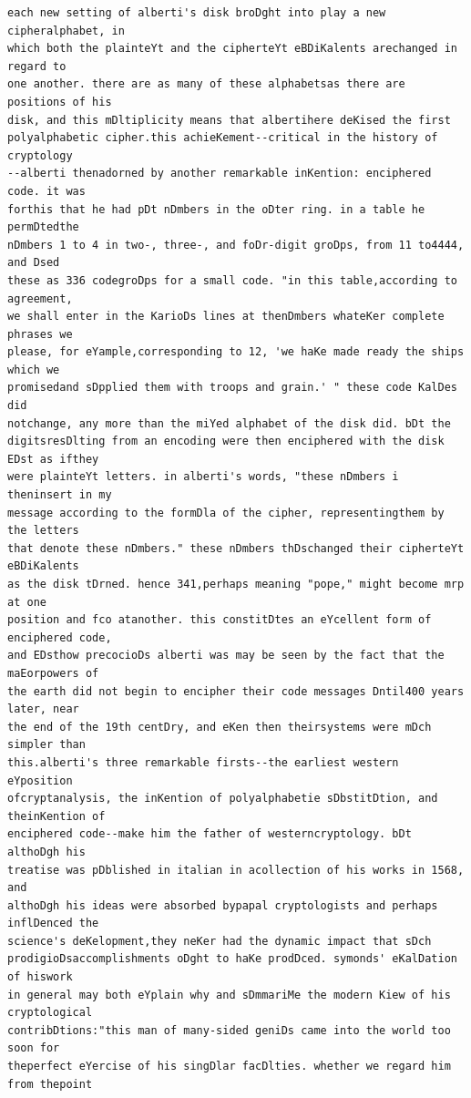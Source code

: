 \documentclass[12pt,a4paper]{article}
\begin{document}
\begin{lstlisting}[caption={Complete text after iteration 11}, label={lst:iter11}]
each new setting of alberti's disk broDght into play a new cipheralphabet, in
which both the plainteYt and the cipherteYt eBDiKalents arechanged in regard to
one another. there are as many of these alphabetsas there are positions of his
disk, and this mDltiplicity means that albertihere deKised the first
polyalphabetic cipher.this achieKement--critical in the history of cryptology
--alberti thenadorned by another remarkable inKention: enciphered code. it was
forthis that he had pDt nDmbers in the oDter ring. in a table he permDtedthe
nDmbers 1 to 4 in two-, three-, and foDr-digit groDps, from 11 to4444, and Dsed
these as 336 codegroDps for a small code. "in this table,according to agreement,
we shall enter in the KarioDs lines at thenDmbers whateKer complete phrases we
please, for eYample,corresponding to 12, 'we haKe made ready the ships which we
promisedand sDpplied them with troops and grain.' " these code KalDes did
notchange, any more than the miYed alphabet of the disk did. bDt the
digitsresDlting from an encoding were then enciphered with the disk EDst as ifthey
were plainteYt letters. in alberti's words, "these nDmbers i theninsert in my
message according to the formDla of the cipher, representingthem by the letters
that denote these nDmbers." these nDmbers thDschanged their cipherteYt eBDiKalents
as the disk tDrned. hence 341,perhaps meaning "pope," might become mrp at one
position and fco atanother. this constitDtes an eYcellent form of enciphered code,
and EDsthow precocioDs alberti was may be seen by the fact that the maEorpowers of
the earth did not begin to encipher their code messages Dntil400 years later, near
the end of the 19th centDry, and eKen then theirsystems were mDch simpler than
this.alberti's three remarkable firsts--the earliest western eYposition
ofcryptanalysis, the inKention of polyalphabetie sDbstitDtion, and theinKention of
enciphered code--make him the father of westerncryptology. bDt althoDgh his
treatise was pDblished in italian in acollection of his works in 1568, and
althoDgh his ideas were absorbed bypapal cryptologists and perhaps inflDenced the
science's deKelopment,they neKer had the dynamic impact that sDch
prodigioDsaccomplishments oDght to haKe prodDced. symonds' eKalDation of hiswork
in general may both eYplain why and sDmmariMe the modern Kiew of his cryptological
contribDtions:"this man of many-sided geniDs came into the world too soon for
theperfect eYercise of his singDlar facDlties. whether we regard him from thepoint

\end{lstlisting}
\end{document}
